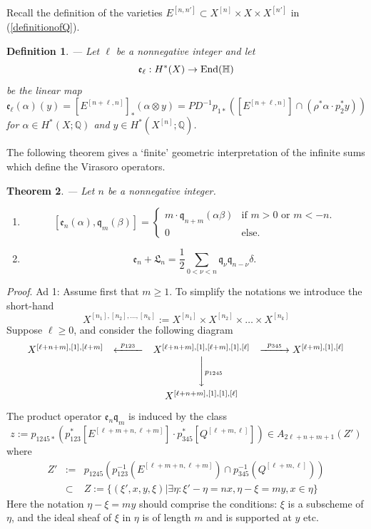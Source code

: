 \documentclass[twoside,11pt]{article}
\newtheorem{theorem}{Theorem}[section]
\newtheorem{definition}[theorem]{Definition}
\newcommand{\prf}{{\kursiv Proof}. }
\newcommand{\kursiv}{\sl}
\newcommand{\IH}{{\mathbb H}}
\newcommand{\IQ}{{\mathbb Q}}
\newcommand{\gothe}{{\mathfrak e}}
\newcommand{\gothq}{{\mathfrak q}}
\newcommand{\gothL}{{\mathfrak L}}
\newcommand{\tensor}{\otimes}
\newcommand{\End}{{\rm End}}
\newcommand{\ee}{\gothe}
\newcommand{\qq}{\gothq}
\newcommand{\LL}{\gothL}
\newcommand{\verylongrightarrow}[1]{\raisebox{0mm}[0.9ex][0ex]{\hbox to #1{\rightarrowfill}}}
\newcommand{\verylongleftarrow}[1]{\raisebox{0mm}[0.9ex][0ex]{\hbox to #1{\leftarrowfill}}}
\begin{document}
Recall the definition of the varieties
$E^{[n,n']}\subset X^{[n]}\times X\times X^{[n']}$ in (\ref{definitionofQ}).

\begin{definition}--- Let $\ell$ be a nonnegative integer and let $$\ee_\ell:H^*(X)\to \End(\IH)$$
be the linear map
$$\ee_\ell(\alpha)(y)=[E^{[n+\ell,n]}]_*(\alpha\tensor y)=PD^{-1}p_{1*}(
[E^{[n+\ell,n]}]\cap(\rho^*\alpha\cdot p_{2}^*y))$$
for $\alpha\in H^*(X;\IQ)$ and $y\in H^*(X^{[n]};\IQ)$.
\end{definition}

The following theorem gives a `finite' geometric interpretation of the infinite
sums which define the Virasoro operators.

\begin{theorem}\label{eqcommutator}--- Let $n$ be a nonnegative integer.
\begin{enumerate}
\item
$$[\ee_n(\alpha),\qq_m(\beta)]=\left\{
\begin{array}{ll}
m\cdot\qq_{n+m}(\alpha\beta)&\mbox{if }m>0\mbox{ or }m<-n.\\
0&\mbox{else}.
\end{array}
\right.$$
\item
$$\ee_n+\LL_n=\frac{1}{2}\sum_{0<\nu<n}\qq_\nu\qq_{n-\nu}\delta.$$ 
\end{enumerate}
\end{theorem}


\prf Ad 1: Assume first that $m\geq1$. To simplify the notations we introduce
the short-hand
$$X^{[n_1],[n_2],\ldots,[n_k]}:=X^{[n_1]}\times X^{[n_2]}\times \ldots\times X^{[n_k]}$$
Suppose $\ell\geq0$, and consider the following diagram
$$\begin{array}{ccccc}
X^{[\ell+n+m],[1],[\ell+m]}&\stackrel{p_{123}}{\verylongleftarrow{3em}}&
X^{[\ell+n+m],[1],[\ell+m],[1],[\ell]}&
\stackrel{p_{345}}{\verylongrightarrow{3em}} X^{[\ell+m],[1],[\ell]} \\
&&\phantom{\scriptstyle p_{1245}}\Bigg\downarrow
{\scriptstyle p_{1245}}\\[3ex]
&&X^{[\ell+n+m],[1],[1],[\ell]}
\end{array}$$
The product operator $\ee_n\qq_m$ is induced by the class
$$z:=p_{1245*}(p_{123}^*[E^{[\ell+m+n,\ell+m]}]\cdot p_{345}^*[Q^{[\ell+m,\ell]}])\in A_{2\ell+n+m+1}(Z')$$
where
\begin{eqnarray*}Z'&:=&p_{1245}(p_{123}^{-1}(E^{[\ell+m+n,\ell+m]})\cap
p_{345}^{-1}(Q^{[\ell+m,\ell]}))\\
&\subset&Z:=\{(\xi',x,y,\xi)|\exists\eta:\xi'-\eta=nx,\eta-\xi=my, x\in\eta\}
\end{eqnarray*}
Here the notation $\eta-\xi=my$ should comprise the conditions: $\xi$ is 
a subscheme of $\eta$, and the ideal sheaf of $\xi$ in $\eta$ is of length $m$
and is supported at $y$ etc.
\end{document}
